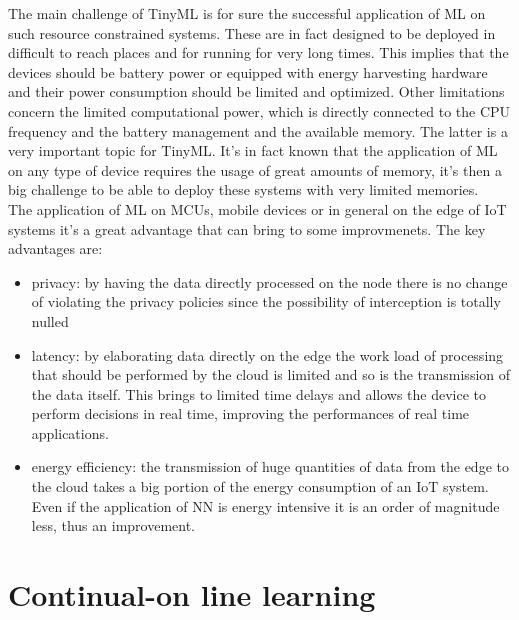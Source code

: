 \documentclass[12pt]{report}
\begin{document}
The main challenge of TinyML is for sure the successful application of ML on such resource constrained systems. These are in fact designed to be deployed in difficult to reach places and for running for very long times. This implies that the devices should be battery power or equipped with energy harvesting hardware and their power consumption should be limited and optimized. Other limitations concern the limited computational power, which is directly connected to the CPU frequency and the battery management and the available memory. The latter is a very important topic for TinyML. It's in fact known that the application of ML on any type of device requires the usage of great amounts of memory, it's then a big challenge to be able to deploy these systems with very limited memories.\\
The application of ML on MCUs, mobile devices or in general on the edge of IoT systems it's a great advantage that can bring to some improvmenets. The key advantages are:
\begin{itemize}
\item privacy: by having the data directly processed on the node there is no change of violating the privacy policies since the possibility of interception is totally nulled
\item latency: by elaborating data directly on the edge the work load of processing that should be performed by the cloud is limited and so is the transmission of the data itself. This brings to limited time delays and allows the device to perform decisions in real time, improving the performances of real time applications.
\item energy efficiency: the transmission of huge quantities of data from the edge to the cloud takes a big portion of the energy consumption of an IoT system. Even if the application of NN is energy intensive it is an order of magnitude less, thus an improvement.
\end{itemize}


\section{Continual-on line learning}
\end{document}

